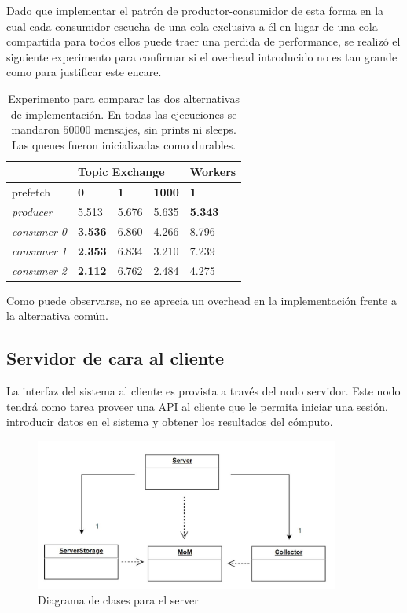 \documentclass[titlepage,a4paper,oneside]{article}
\begin{document}
Dado que implementar el patrón de productor-consumidor de esta forma en la cual cada consumidor escucha de una cola exclusiva a él en lugar de una cola compartida para todos ellos puede traer una perdida de performance, se realizó el siguiente experimento para confirmar si el overhead introducido no es tan grande como para justificar este encare.

\begin{table}[H]
\centering
\begin{tabular}{l|llll|}
\cline{2-5}
\cellcolor[HTML]{FFFFFF}                  & \multicolumn{3}{l|}{\textbf{Topic Exchange}} & \textbf{Workers} \\ \hline
\multicolumn{1}{|l|}{prefetch} & \multicolumn{1}{l|}{\textbf{0}} & \multicolumn{1}{l|}{\textbf{1}} & \multicolumn{1}{l|}{\textbf{1000}} & \textbf{1} \\ \hline
\multicolumn{1}{|l|}{\textit{producer}}   & 5.513               & 5.676      & 5.635      & \textbf{5.343}   \\
\multicolumn{1}{|l|}{\textit{consumer 0}} & \textbf{3.536}      & 6.860      & 4.266      & 8.796            \\
\multicolumn{1}{|l|}{\textit{consumer 1}} & \textbf{2.353}      & 6.834      & 3.210      & 7.239            \\
\multicolumn{1}{|l|}{\textit{consumer 2}} & \textbf{2.112}      & 6.762      & 2.484      & 4.275            \\ \hline
\end{tabular}
\caption{Experimento para comparar las dos alternativas de implementación. En todas las ejecuciones se mandaron $50000$ mensajes, sin prints ni sleeps. Las queues fueron inicializadas como durables.}
\label{exp-dex-wrk}
\end{table}

Como puede observarse, no se aprecia un overhead en la implementación frente a la alternativa común.

\subsection{Servidor de cara al cliente}\label{ServerClient}

La interfaz del sistema al cliente es provista a través del nodo servidor. Este nodo tendrá como tarea proveer una API al cliente que le permita iniciar una sesión, introducir datos en el sistema y obtener los resultados del cómputo.

\begin{figure}[H]
	\centering
	\includegraphics[width=10cm]{img/server_class.JPG}
	\caption{Diagrama de clases para el server}
\end{figure}
\end{document}
